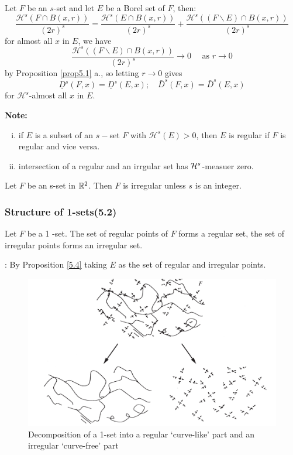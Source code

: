\begin{proposition}\label{5.4}
    Let $F$ be an $s$-set and let $E$ be a Borel set of $F$, then:
    $$
\frac{\mathcal{H}^{s}(F \cap B(x, r))}{(2 r)^{s}}=\frac{\mathcal{H}^{s}(E \cap B(x, r))}{(2 r)^{s}}+\frac{\mathcal{H}^{s}((F \backslash E) \cap B(x, r))}{(2 r)^{s}}
$$
for almost all $x$ in $E$, we have
$$
\frac{\mathcal{H}^{s}((F \backslash E) \cap B(x, r))}{(2 r)^{s}} \rightarrow 0 \quad \text { as } r \rightarrow 0
$$
by Proposition \ref{prop5.1} a., so letting $r \rightarrow 0$ gives
$$
\underline{D}^{s}(F, x)=\underline{D}^{s}(E, x) ; \quad \bar{D}^{s}(F, x)=\bar{D}^{s}(E, x)
$$
for $\mathcal{H}^s$-almost all $x$ in $E$.
\end{proposition} 
\textbf{Note: } 
\begin{enumerate}[(i)]
    \item if $E$ is a subset of an $s-$set $F$ with $\mathcal{H}^s(E)>0$, then $E$ is regular if $F$ is regular and vice versa. 
    \item intersection of a regular and an irrgular set has $\mathcal{H}^s$-measuer zero. 
\end{enumerate}

\begin{theorem}
    Let $F$ be an s-set in $\mathbb{R}^2$. Then $F$ is irregular unless $s$ is an integer.
\end{theorem}

\newpage
\subsubsection{Structure of 1-sets(5.2)}
\begin{theorem}
    Let $F$ be a 1 -set. The set of regular points of $F$ forms a regular set, the set of irregular points forms an irregular set.
\end{theorem}
\proof: By Proposition \ref{5.4} taking $E$ as the set of regular and irregular points. 

\begin{figure}[H]
    \centering
    \includegraphics[width=.66\textwidth]{images/decomp1set.png}
    \caption{Decomposition of a 1-set into a regular ‘curve-like’ part and an irregular ‘curve-free’ part}
    \label{fig:decomp1set}
\end{figure}

